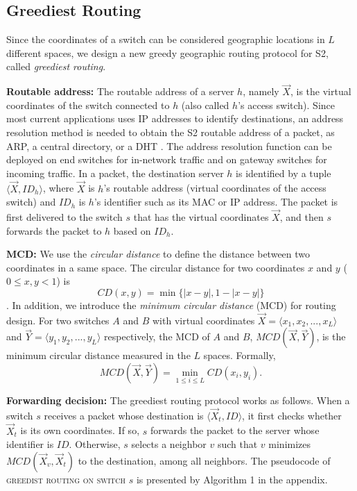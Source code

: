 \documentclass[10pt,conference]{IEEEtran}
\begin{document}
\subsection{Greediest Routing}

Since the coordinates of a switch can be considered geographic locations in $L$ different spaces, we design a new greedy geographic routing protocol for S2, called \emph{greediest routing}. 

\textbf{Routable address:} The routable address of a server $h$, namely  $\vec{X}$, is the virtual coordinates of the switch connected to $h$ (also called $h$'s access switch).
Since most current applications uses IP addresses to identify destinations, an address resolution method is needed to obtain the S2 routable address of a packet, as ARP, a central directory, or a DHT \cite{SEATTLE, ROME}. The address resolution function can be deployed on end switches for in-network traffic and on gateway switches for incoming traffic.
In a packet, the destination server $h$  is identified by a tuple $\langle \vec{X}, ID_h \rangle$, where $\vec{X}$ is $h$'s  routable address (virtual coordinates of the access switch) and $ID_h$ is $h$'s identifier such as its MAC or IP address.
The packet is first delivered to the switch $s$ that has the virtual coordinates $\vec{X}$, and then $s$  forwards the packet to $h$ based on $ID_h$.

\textbf{MCD: }We use the \emph{circular distance} to define the distance between two coordinates in a same space.
The circular distance for two coordinates $x$ and $y$ ($0 \leq x,y < 1$) is
\setlength{\abovedisplayskip}{0.1ex}
\setlength{\belowdisplayskip}{0.1ex}
\[CD(x,y) = \min \{|x-y|,1-|x-y|\}\].
In addition, we introduce the \emph{minimum circular distance} (MCD) for routing design.
For two switches $A$ and $B$ with virtual coordinates $\vec{X} = \langle x_1, x_2, ..., x_L \rangle$ and $\vec{Y}= \langle y_{1}, y_{2}, ..., y_{L} \rangle$ respectively, the MCD of $A$ and $B$, $MCD(\vec{X}, \vec{Y})$, is the minimum circular distance measured in the $L$ spaces.
Formally,
\[MCD(\vec{X}, \vec{Y}) = \min_{1 \leq i \leq L} CD(x_{i},y_{i}). \]

\textbf{Forwarding decision:}
The greediest routing protocol works as follows.
When a switch $s$ receives a packet whose destination is $\langle \vec{X}_{t}, ID \rangle$, it first checks whether $\vec{X}_{t}$  is its own coordinates.
If so, $s$ forwards the packet to the server whose identifier is $ID$. Otherwise, $s$ selects a neighbor $v$ such that $v$ minimizes $MCD(\vec{X}_v,\vec{X}_t)$ to the destination, among all neighbors.
The pseudocode of \textsc{greedist routing on switch} $s$ is presented by Algorithm 1 in the appendix.
\end{document}

